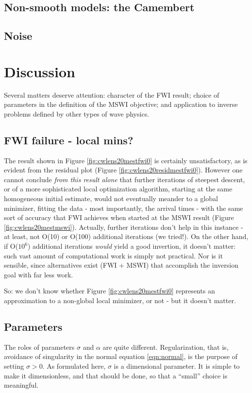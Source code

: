 \subsection{Non-smooth models: the Camembert}

\subsection{Noise}



\section{Discussion}
Several matters deserve attention: character of the FWI result; choice of parameters in the
definition of the MSWI objective; and application to inverse problems
defined by other types of wave physics.

\subsection{FWI failure - local mins?}
The result shown in Figure \ref{fig:cwlens20mestfwi0} is certainly
unsatisfactory, as is evident from the residual plot (Figure
\ref{fig:cwlens20residmestfwi0}). However one cannot conclude {\em
  from this result alone} that further
iterations of steepest descent, or of a more sophisticated local
optimization algorithm, starting at the same homogeneous initial
estimate, would not eventually meander to a global
minimizer, fitting the data - most importantly, the arrival times -
with the same sort of accuracy that FWI achieves when started at the
MSWI result (Figure \ref{fig:cwlens20mestmswi}). Actually, further iterations don't help
in this instance - at least, not O(10) or O(100) additional
iterations (we tried!). On the other hand, if O($10^6$)
additional iterations {\em would} yield a good invertion, it doesn't matter: such vast amount of computational
work is simply not practical. Nor is it sensible, since alternatives
exist (FWI + MSWI) that accomplish the inversion goal with far less
work.

So: we don't know whether Figure \ref{fig:cwlens20mestfwi0} represents an
approximation to a non-global local minimizer, or not - but it doesn't matter.

\subsection{Parameters}
The roles of parameters $\sigma$ and $\alpha$ are quite
different. Regularization, that is, avoidance of singularity in the
normal equation \ref{eqn:normal}, is the purpose of setting $\sigma >
0$. As formulated here, $\sigma$ is a dimensional parameter. It is
simple to make it dimensionless, and that should be done, so that a
``small'' choice is meaningful.

